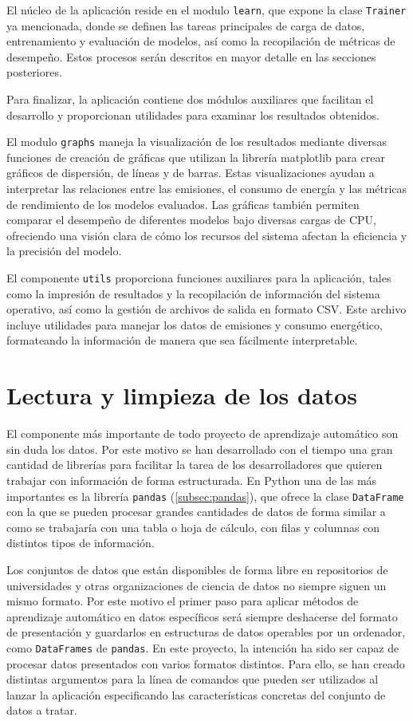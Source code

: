 El núcleo de la aplicación reside en el modulo \texttt{learn}, que expone la clase \texttt{Trainer} ya mencionada, donde se definen las tareas principales de carga de datos, entrenamiento y evaluación de modelos, así como la recopilación de métricas de desempeño. Estos procesos serán descritos en mayor detalle en las secciones posteriores.

Para finalizar, la aplicación contiene dos módulos auxiliares que facilitan el desarrollo y proporcionan utilidades para examinar los resultados obtenidos.

El modulo \texttt{graphs} maneja la visualización de los resultados mediante diversas funciones de creación de gráficas que utilizan la librería matplotlib para crear gráficos de dispersión, de líneas y de barras. Estas visualizaciones ayudan a interpretar las relaciones entre las emisiones, el consumo de energía y las métricas de rendimiento de los modelos evaluados. Las gráficas también permiten comparar el desempeño de diferentes modelos bajo diversas cargas de CPU, ofreciendo una visión clara de cómo los recursos del sistema afectan la eficiencia y la precisión del modelo.

El componente \texttt{utils} proporciona funciones auxiliares para la aplicación, tales como la impresión de resultados y la recopilación de información del sistema operativo, así como la gestión de archivos de salida en formato CSV. Este archivo incluye utilidades para manejar los datos de emisiones y consumo energético, formateando la información de manera que sea fácilmente interpretable. 


\section{Lectura y limpieza de los datos}
\label{sec:limpieza}

El componente más importante de todo proyecto de aprendizaje automático son sin duda los datos. Por este motivo se han desarrollado con el tiempo una gran cantidad de librerías para facilitar la tarea de los desarrolladores que quieren trabajar con información de forma estructurada. En Python una de las más importantes es la librería \texttt{pandas} (\ref{subsec:pandas}), que ofrece la clase \texttt{DataFrame} con la que se pueden procesar grandes cantidades de datos de forma similar a como se trabajaría con una tabla o hoja de cálculo, con filas y columnas con distintos tipos de información.

Los conjuntos de datos que están disponibles de forma libre en repositorios de universidades y otras organizaciones de ciencia de datos no siempre siguen un mismo formato. Por este motivo el primer paso para aplicar métodos de aprendizaje automático en datos específicos será siempre deshacerse del formato de presentación y guardarlos en estructuras de datos operables por un ordenador, como \texttt{DataFrames} de \texttt{pandas}. En este proyecto, la intención ha sido ser capaz de procesar datos presentados con varios formatos distintos. Para ello, se han creado distintas argumentos para la línea de comandos que pueden ser utilizados al lanzar la aplicación especificando las características concretas del conjunto de datos a tratar.

